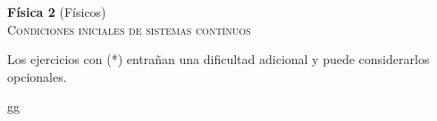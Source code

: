 \documentclass[11pt,spanish,a4paper]{article}
\begin{document}
\begin{center}
\textbf{Física 2} (Físicos) \hfill {}\\
\textsc{\LARGE Condiciones iniciales de sistemas contínuos}
\end{center}

Los ejercicios con (*) entrañan una dificultad adicional y puede considerarlos opcionales.

\begin{enumerate}






gg
\end{enumerate}
\end{document}
